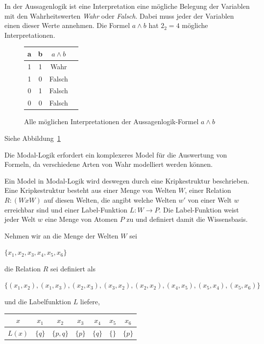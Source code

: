 In der Aussagenlogik ist eine Interpretation eine mögliche Belegung der Variablen mit den Wahrheitswerten \emph{Wahr} oder \emph{Falsch}. Dabei muss jeder der Variablen einen dieser Werte annehmen. Die Formel $a \wedge b$ hat $2_2 = 4$ mögliche Interpretationen. 
\begin{figure}[ht]
	\begin{center}
		\begin{tabular}{cccc}
		\hline
		a & b & $a \wedge b$\\
		\hline
		1 & 1 & Wahr\\
		\hline
		1 & 0 & Falsch\\
		\hline
		0 & 1 & Falsch\\
		\hline
		0 & 0 & Falsch\\
		\hline
		\end{tabular}
		\caption{Alle möglichen Interpretationen der Aussagenlogik-Formel $a \wedge b$}
		\label{tab:AussagenlogikInterpretation}
	\end{center}
\end{figure}
Siehe Abbildung~\ref{tab:AussagenlogikInterpretation}
\cite{hunter1973metalogic}%

Die Modal-Logik erfordert ein komplexeres Model für die Auswertung von Formeln, da verschiedene Arten von Wahr modelliert werden können.\cite[S.308f]{huth2004logic}

Ein Model in Modal-Logik wird deswegen durch eine Kripkestruktur beschrieben. Eine Kripkestruktur besteht aus einer Menge von Welten $W$, einer Relation $R:(WxW)$ auf diesen Welten, die angibt welche Welten $w'$ von einer Welt $w$ erreichbar sind und einer Label-Funktion $L: W \rightarrow P$. 
Die Label-Funktion weist jeder Welt $w$ eine Menge von Atomen $P$ zu und definiert damit die Wissensbasis. 

Nehmen wir an die Menge der Welten $W$ sei 
\begin{center}
	$\{ x_1, x_2, x_3, x_4, x_5, x_6 \}$
\end{center}
 
die Relation $R$ sei definiert als 
\begin{center}
	$\{(x_1, x_2), (x_1, x_3), (x_2, x_3), (x_3, x_2), (x_2, x_2), (x_4, x_5), (x_5, x_4), (x_5, x_6)\}$ 
\end{center}

und die Labelfunktion $L$ liefere,
\begin{center}
	\begin{tabular}{c|cccccc}
		$x$ & $x_1$ & $x_2$ & $x_3$ & $x_4$ & $x_5$ & $x_6$\\
		\hline
		$L(x)$ & $\{q\}$ & $\{p,q\}$ & $\{p\}$ & $\{q\}$ & $\{\}$ & $\{p\}$
	\end{tabular}
\end{center}


